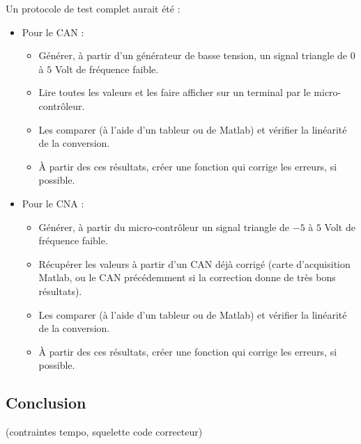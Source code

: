 Un protocole de test complet aurait été :\\
\begin{itemize}
\item Pour le CAN : 
	\begin{itemize}
		\item Générer, à partir d'un générateur de basse tension, un signal triangle de $0$ à $5$ Volt de fréquence faible.
		\item Lire toutes les valeurs et les faire afficher sur un terminal par le micro-contrôleur.
		\item Les comparer (à l'aide d'un tableur ou de Matlab) et vérifier la linéarité de la conversion.
		\item À partir des ces résultats, créer une fonction qui corrige les erreurs, si possible.
	\end{itemize}

\item Pour le CNA :
	\begin{itemize}
		\item Générer, à partir du micro-contrôleur un signal triangle de $-5$ à $5$ Volt de fréquence faible.
		\item Récupérer les valeurs à partir d'un CAN déjà corrigé (carte d'acquisition Matlab, ou le CAN précédemment si la correction donne de très bons résultats).
		\item Les comparer (à l'aide d'un tableur ou de Matlab) et vérifier la linéarité de la conversion.
		\item À partir des ces résultats, créer une fonction qui corrige les erreurs, si possible.
	\end{itemize}
\end{itemize}

	\subsection{Conclusion}
	  	(contraintes tempo, squelette code correcteur)


